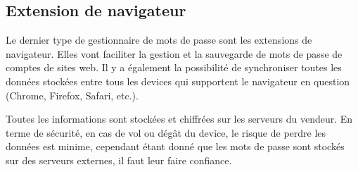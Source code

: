 \subsection{Extension de navigateur}
Le dernier type de gestionnaire de mots de passe sont les extensions de navigateur. Elles vont faciliter la gestion et la sauvegarde de mots de passe de comptes de sites web. Il y a également la possibilité de synchroniser toutes les données stockées entre tous les devices qui supportent le navigateur en question (Chrome, Firefox, Safari, etc.).

Toutes les informations sont stockées et chiffrées sur les serveurs du vendeur. En terme de sécurité, en cas de vol ou dégât du device, le risque de perdre les données est minime, cependant étant donné que les mots de passe sont stockés sur des serveurs externes, il faut leur faire confiance.
